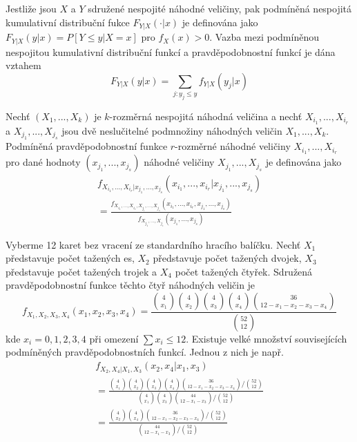 \begin{definition}
Jestliže jsou $X$ a $Y$ sdružené nespojité náhodné veličiny, pak podmíněná nespojitá kumulativní distribuční fukce $F_{Y|X}(\cdot | x)$ je definována jako $F_{Y|X}(y|x) = P[Y \le y | X = x]$ pro $f_X(x) > 0$. Vazba mezi podmíněnou nespojitou kumulativní distribuční funkcí a pravděpodobnostní funkcí je dána vztahem
\begin{equation*}
F_{Y|X}(y|x) = \sum_{j:y_j \le y} f_{Y|X}(y_j | x)
\end{equation*}
\end{definition}

\begin{definition}
Nechť $(X_1, ..., X_k)$ je $k$-rozměrná nespojitá náhodná veličina a nechť $X_{i_1}, ..., X_{i_r}$ a $X_{j_1}, ..., X_{j_s}$ jsou dvě neslučitelné podmnožiny náhodných veličin $X_1, ..., X_k$. Podmíněná pravděpodobnostní funkce $r$-rozměrné náhodné veličiny $X_{i_1}, ..., X_{i_r}$ pro dané hodnoty $(x_{j_1}, ..., x_{j_s})$ náhodné veličiny $X_{j_1}, ..., X_{j_s}$ je definována jako
\begin{gather*}
f_{X_{i_1}, ..., X_{i_r}|x_{j_1},...,x_{j_s}}(x_{i_1}, ..., x_{i_r}|x_{j_1}, ..., x_{j_s})\\
= \frac{f_{X_{i_1}, ..., X_{i_r}, X_{j_i}, ..., X_{j_s}}(x_{i_1}, ..., x_{i_r}, x_{j_1}, ..., x_{j_s})}{f_{X_{j_1}, ..., X_{j_s}}(x_{j_1}, ..., x_{j_s})}
\end{gather*}
\end{definition}

\begin{example}
Vyberme 12 karet bez vracení ze standardního hracího balíčku. Nechť $X_1$ představuje počet tažených es, $X_2$ představuje počet tažených dvojek, $X_3$ představuje počet tažených trojek a $X_4$ počet tažených čtyřek. Sdružená pravděpodobnostní funkce těchto čtyř náhodných veličin je
\begin{equation*}
f_{X_1, X_2, X_3, X_4}(x_1, x_2, x_3, x_4) = \frac{\binom{4}{x_1}\binom{4}{x_2}\binom{4}{x_3}\binom{4}{x_4}\binom{36}{12 - x_1 - x_2 - x_3 - x_4}}{\binom{52}{12}}
\end{equation*}
kde $x_i = 0, 1, 2, 3, 4$ při omezení $\sum x_i \le 12$. Existuje velké množství souvisejících podmíněných pravděpodobnostních funkcí. Jednou z nich je např.
\begin{gather*}
f_{X_2, X_4 | X_1, X_3}(x_2, x_4 | x_1, x_3)\\
= \frac{\binom{4}{x_1}\binom{4}{x_2}\binom{4}{x_3}\binom{4}{x_4}\binom{36}{12 - x_1 - x_2 - x_3 - x_4} \Big/ \binom{52}{12}}{\binom{4}{x_1}\binom{4}{x_3}\binom{44}{12 - x_1 - x_3} \Big/ \binom{52}{12}}\\
= \frac{\binom{4}{x_2}\binom{4}{x_4}\binom{36}{12 - x_1 - x_2 - x_3 - x_4} \Big/ \binom{52}{12}}{\binom{44}{12 - x_1 - x_3} \Big/ \binom{52}{12}}
\end{gather*}
\end{example}


